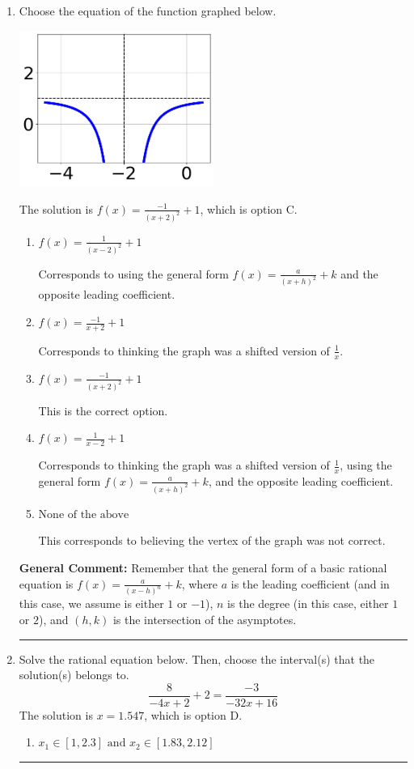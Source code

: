 \documentclass{extbook}[14pt]
\newcommand{\litem}[1]{\item #1

\rule{\textwidth}{0.4pt}}
\begin{document}
\begin{enumerate}\litem{
Choose the equation of the function graphed below.

\begin{center}
    \includegraphics[width=0.5\textwidth]{../Figures/rationalGraphToEquationCopyC.png}
\end{center}


The solution is \( f(x) = \frac{-1}{(x + 2)^2} + 1 \), which is option C.\begin{enumerate}[label=\Alph*.]
\item \( f(x) = \frac{1}{(x - 2)^2} + 1 \)

Corresponds to using the general form $f(x) = \frac{a}{(x+h)^2}+k$ and the opposite leading coefficient.
\item \( f(x) = \frac{-1}{x + 2} + 1 \)

Corresponds to thinking the graph was a shifted version of $\frac{1}{x}$.
\item \( f(x) = \frac{-1}{(x + 2)^2} + 1 \)

This is the correct option.
\item \( f(x) = \frac{1}{x - 2} + 1 \)

Corresponds to thinking the graph was a shifted version of $\frac{1}{x}$, using the general form $f(x) = \frac{a}{(x+h)^2}+k$, and the opposite leading coefficient.
\item \( \text{None of the above} \)

This corresponds to believing the vertex of the graph was not correct.
\end{enumerate}

\textbf{General Comment:} Remember that the general form of a basic rational equation is $ f(x) = \frac{a}{(x-h)^n} + k$, where $a$ is the leading coefficient (and in this case, we assume is either $1$ or $-1$), $n$ is the degree (in this case, either $1$ or $2$), and $(h, k)$ is the intersection of the asymptotes.
}
\litem{
Solve the rational equation below. Then, choose the interval(s) that the solution(s) belongs to.
\[ \frac{8}{-4x + 2} + 2 = \frac{-3}{-32x + 16} \]The solution is \( x = 1.547 \), which is option D.\begin{enumerate}[label=\Alph*.]
\item \( x_1 \in [1, 2.3] \text{ and } x_2 \in [1.83,2.12] \)


\end{enumerate}}
\end{enumerate}
\end{document}
